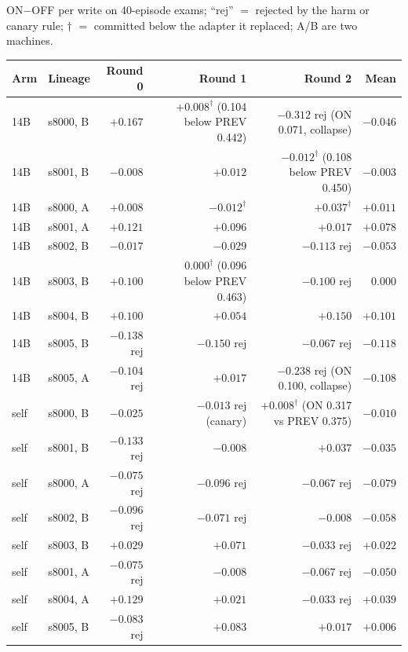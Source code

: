 \documentclass{article}
\newcommand{\onoff}{ON$-$OFF}
\begin{document}
\onoff{} per write on 40-episode exams; ``rej'' $=$ rejected by the harm or canary rule; $\dagger$ $=$ committed below the adapter it replaced; A/B are two machines.
\begin{center}\small
\begin{tabular}{llrrrr}
\toprule
Arm & Lineage & Round 0 & Round 1 & Round 2 & Mean \\
\midrule
14B & s8000, B & $+0.167$ & $+0.008^{\dagger}$ (0.104 below PREV 0.442) & $-0.312$ rej (ON 0.071, collapse) & $-0.046$ \\
14B & s8001, B & $-0.008$ & $+0.012$ & $-0.012^{\dagger}$ (0.108 below PREV 0.450) & $-0.003$ \\
14B & s8000, A & $+0.008$ & $-0.012^{\dagger}$ & $+0.037^{\dagger}$ & $+0.011$ \\
14B & s8001, A & $+0.121$ & $+0.096$ & $+0.017$ & $+0.078$ \\
14B & s8002, B & $-0.017$ & $-0.029$ & $-0.113$ rej & $-0.053$ \\
14B & s8003, B & $+0.100$ & $0.000^{\dagger}$ (0.096 below PREV 0.463) & $-0.100$ rej & $0.000$ \\
14B & s8004, B & $+0.100$ & $+0.054$ & $+0.150$ & $+0.101$ \\
14B & s8005, B & $-0.138$ rej & $-0.150$ rej & $-0.067$ rej & $-0.118$ \\
14B & s8005, A & $-0.104$ rej & $+0.017$ & $-0.238$ rej (ON 0.100, collapse) & $-0.108$ \\
\midrule
self & s8000, B & $-0.025$ & $-0.013$ rej (canary) & $+0.008^{\dagger}$ (ON 0.317 vs PREV 0.375) & $-0.010$ \\
self & s8001, B & $-0.133$ rej & $-0.008$ & $+0.037$ & $-0.035$ \\
self & s8000, A & $-0.075$ rej & $-0.096$ rej & $-0.067$ rej & $-0.079$ \\
self & s8002, B & $-0.096$ rej & $-0.071$ rej & $-0.008$ & $-0.058$ \\
self & s8003, B & $+0.029$ & $+0.071$ & $-0.033$ rej & $+0.022$ \\
self & s8001, A & $-0.075$ rej & $-0.008$ & $-0.067$ rej & $-0.050$ \\
self & s8004, A & $+0.129$ & $+0.021$ & $-0.033$ rej & $+0.039$ \\
self & s8005, B & $-0.083$ rej & $+0.083$ & $+0.017$ & $+0.006$ \\
\bottomrule
\end{tabular}
\end{center}
\end{document}

